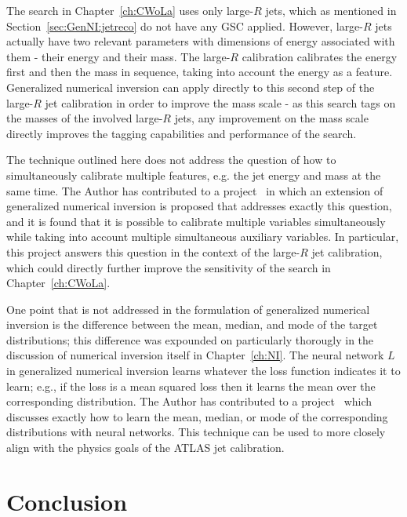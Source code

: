 The search in Chapter~\ref{ch:CWoLa} uses only large-$R$ jets, which as mentioned in Section~\ref{sec:GenNI:jetreco} do not have any GSC applied.
However, large-$R$ jets actually have two relevant parameters with dimensions of energy associated with them - their energy and their mass.
The large-$R$ calibration calibrates the energy first and then the mass in sequence, taking into account the energy as a feature.
Generalized numerical inversion can apply directly to this second step of the large-$R$ jet calibration in order to improve the mass scale - as this search tags on the masses of the involved large-$R$ jets, any improvement on the mass scale directly improves the tagging capabilities and performance of the search.

The technique outlined here does not address the question of how to simultaneously calibrate multiple features, e.g. the jet energy and mass at the same time.
The Author has contributed to a project~\cite{ATL-PHYS-PUB-2020-001} in which an extension of generalized numerical inversion is proposed that addresses exactly this question, and it is found that it is possible to calibrate multiple variables simultaneously while taking into account multiple simultaneous auxiliary variables.
In particular, this project answers this question in the context of the large-$R$ jet calibration, which could directly further improve the sensitivity of the search in Chapter~\ref{ch:CWoLa}.

One point that is not addressed in the formulation of generalized numerical inversion is the difference between the mean, median, and mode of the target distributions; this difference was expounded on particularly thorougly in the discussion of numerical inversion itself in Chapter~\ref{ch:NI}.
The neural network $L$ in generalized numerical inversion learns whatever the loss function indicates it to learn; e.g., if the loss is a mean squared loss then it learns the mean over the corresponding distribution.
The Author has contributed to a project~\cite{Cheong:2019upg} which discusses exactly how to learn the mean, median, or mode of the corresponding distributions with neural networks.
This technique can be used to more closely align with the physics goals of the ATLAS jet calibration.

\section{Conclusion}
\label{sec:GenNI:conclusion}

